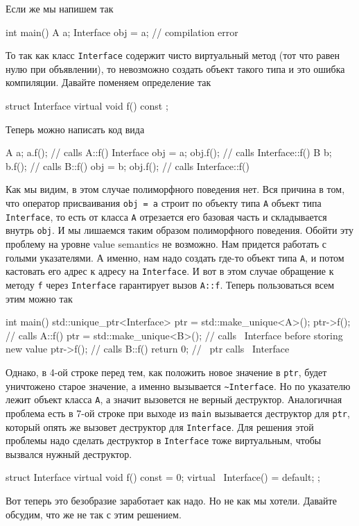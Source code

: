 Если же мы напишем так
\begin{cppcode}
int main() {
  A a;
  Interface obj = a; // compilation error
}
\end{cppcode}
То так как класс \texttt{Interface} содержит чисто виртуальный метод (тот что равен нулю при объявлении), то невозможно создать объект такого типа и это ошибка компиляции.
Давайте поменяем определение так
\begin{cppcode}
struct Interface {
  virtual void f() const {}
};
\end{cppcode}
Теперь можно написать код вида
\begin{cppcode}
A a;
a.f(); // calls A::f()
Interface obj = a;
obj.f(); // calls Interface::f()
B b;
b.f(); // calls B::f()
obj = b;
obj.f(); // calls Interface::f()
\end{cppcode}
Как мы видим, в этом случае полиморфного поведения нет.
Вся причина в том, что оператор присваивания \texttt{obj = a} строит по объекту типа \texttt{A} объект типа \texttt{Interface}, то есть от класса \texttt{A} отрезается его базовая часть и складывается внутрь \texttt{obj}.
И мы лишаемся таким образом полиморфного поведения.
Обойти эту проблему на уровне value semantics не возможно.
Нам придется работать с голыми указателями.
А именно, нам надо создать где-то объект типа \texttt{A}, и потом кастовать его адрес к адресу на \texttt{Interface}.
И вот в этом случае обращение к методу \texttt{f} через \texttt{Interface} гарантирует вызов \texttt{A::f}.
Теперь пользоваться всем этим можно так
\begin{cppcode}
int main() {
  std::unique_ptr<Interface> ptr = std::make_unique<A>();
  ptr->f(); // calls A::f()
  ptr = std::make_unique<B>(); // calls ~Interface before storing new value
  ptr->f(); // calls B::f()
  return 0;
} // ~ptr calls ~Interface
\end{cppcode}
Однако, в 4-ой строке перед тем, как положить новое значение в \texttt{ptr}, будет уничтожено старое значение, а именно вызывается \texttt{\~{}Interface}.
Но по указателю лежит объект класса \texttt{A}, а значит вызовется не верный деструктор.
Аналогичная проблема есть в 7-ой строке при выходе из \texttt{main} вызывается деструктор для \texttt{ptr}, который опять же вызовет деструктор для \texttt{Interface}.
Для решения этой проблемы надо сделать деструктор в \texttt{Interface} тоже виртуальным, чтобы вызвался нужный деструктор.
\begin{cppcode}
struct Interface {
  virtual void f() const = 0;
  virtual ~Interface() = default;
};
\end{cppcode}
Вот теперь это безобразие заработает как надо.
Но не как мы хотели.
Давайте обсудим, что же не так с этим решением.


